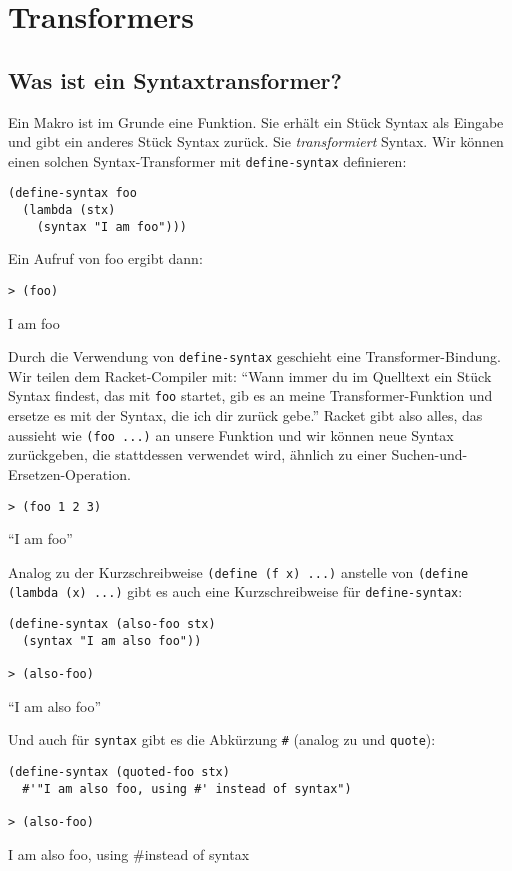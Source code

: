 \section{Transformers}
\subsection{Was ist ein Syntaxtransformer?}

Ein Makro ist im Grunde eine Funktion. Sie erhält ein Stück Syntax als Eingabe und gibt ein anderes Stück Syntax zurück. Sie \textit{transformiert} Syntax. Wir können einen solchen Syntax-Transformer mit \texttt{define-syntax} definieren:

\begin{lstlisting}
(define-syntax foo
  (lambda (stx)
    (syntax "I am foo")))
\end{lstlisting}

Ein Aufruf von foo ergibt dann:

\begin{lstlisting}
> (foo)
\end{lstlisting}
{\routput {\qq}I am foo{\qq}}

Durch die Verwendung von \texttt{define-syntax} geschieht eine Transformer-Bindung. Wir teilen dem Racket-Compiler mit: ``Wann immer du im Quelltext ein Stück Syntax findest, das mit \texttt{foo} startet, gib es an meine Transformer-Funktion und ersetze es mit der Syntax, die ich dir zurück gebe.'' Racket gibt also alles, das aussieht wie \texttt{(foo ...)} an unsere Funktion und wir können neue Syntax zurückgeben, die stattdessen verwendet wird, ähnlich zu einer Suchen-und-Ersetzen-Operation.

\begin{lstlisting}
> (foo 1 2 3)
\end{lstlisting}
{\routput ``I am foo''}

Analog zu der Kurzschreibweise \texttt{(define (f x) ...)} anstelle von \texttt{(define (lambda (x) ...)} gibt es auch eine Kurzschreibweise für \texttt{define-syntax}:

\begin{lstlisting}
(define-syntax (also-foo stx)
  (syntax "I am also foo"))
  
> (also-foo)
\end{lstlisting}
{\routput ``I am also foo''}

Und auch für \texttt{syntax} gibt es die Abkürzung \texttt{\#\q} (analog zu \texttt{\q} und \texttt{quote}):

\begin{lstlisting}
(define-syntax (quoted-foo stx)
  #'"I am also foo, using #' instead of syntax")
  
> (also-foo)
\end{lstlisting}
{\routput {\qq}I am also foo, using \#\q instead of syntax{\qq}}

